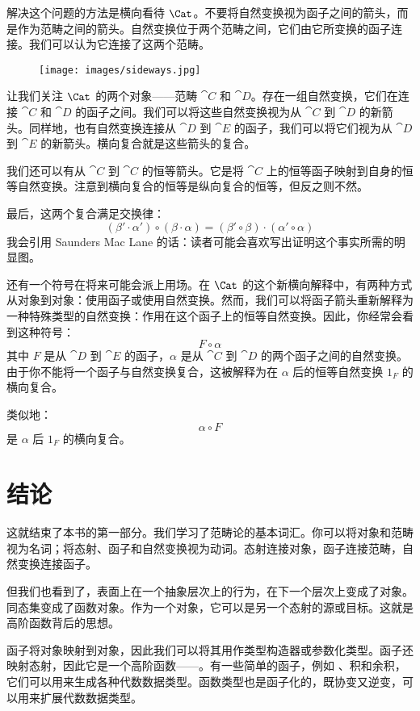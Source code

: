 解决这个问题的方法是横向看待 $\Cat$。不要将自然变换视为函子之间的箭头，而是作为范畴之间的箭头。自然变换位于两个范畴之间，它们由它所变换的函子连接。我们可以认为它连接了这两个范畴。

\begin{figure}[H]
  \centering
  \texttt{[image: images/sideways.jpg]}
\end{figure}

\noindent
让我们关注 $\Cat$ 的两个对象——范畴 $\cat{C}$ 和 $\cat{D}$。存在一组自然变换，它们在连接 $\cat{C}$ 和 $\cat{D}$ 的函子之间。我们可以将这些自然变换视为从 $\cat{C}$ 到 $\cat{D}$ 的新箭头。同样地，也有自然变换连接从 $\cat{D}$ 到 $\cat{E}$ 的函子，我们可以将它们视为从 $\cat{D}$ 到 $\cat{E}$ 的新箭头。横向复合就是这些箭头的复合。

我们还可以有从 $\cat{C}$ 到 $\cat{C}$ 的恒等箭头。它是将 $\cat{C}$ 上的恒等函子映射到自身的恒等自然变换。注意到横向复合的恒等是纵向复合的恒等，但反之则不然。

最后，这两个复合满足交换律：
\[(\beta' \cdot \alpha') \circ (\beta \cdot \alpha) = (\beta' \circ \beta) \cdot (\alpha' \circ \alpha)\]
我会引用 Saunders Mac Lane 的话：读者可能会喜欢写出证明这个事实所需的明显图。

还有一个符号在将来可能会派上用场。在 $\Cat$ 的这个新横向解释中，有两种方式从对象到对象：使用函子或使用自然变换。然而，我们可以将函子箭头重新解释为一种特殊类型的自然变换：作用在这个函子上的恒等自然变换。因此，你经常会看到这种符号：
\[F \circ \alpha\]
其中 $F$ 是从 $\cat{D}$ 到 $\cat{E}$ 的函子，$\alpha$ 是从 $\cat{C}$ 到 $\cat{D}$ 的两个函子之间的自然变换。由于你不能将一个函子与自然变换复合，这被解释为在 $\alpha$ 后的恒等自然变换 $1_F$ 的横向复合。

类似地：
\[\alpha \circ F\]
是 $\alpha$ 后 $1_F$ 的横向复合。

\section{结论}

这就结束了本书的第一部分。我们学习了范畴论的基本词汇。你可以将对象和范畴视为名词；将态射、函子和自然变换视为动词。态射连接对象，函子连接范畴，自然变换连接函子。

但我们也看到了，表面上在一个抽象层次上的行为，在下一个层次上变成了对象。同态集变成了函数对象。作为一个对象，它可以是另一个态射的源或目标。这就是高阶函数背后的思想。

函子将对象映射到对象，因此我们可以将其用作类型构造器或参数化类型。函子还映射态射，因此它是一个高阶函数——。有一些简单的函子，例如 、积和余积，它们可以用来生成各种代数数据类型。函数类型也是函子化的，既协变又逆变，可以用来扩展代数数据类型。

